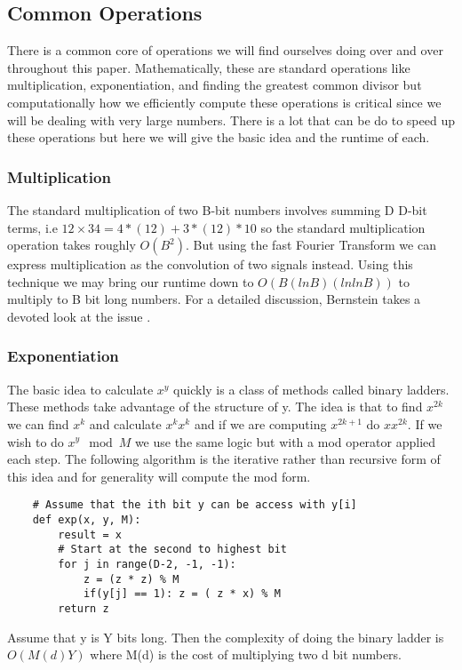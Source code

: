 \documentclass{article}
\begin{document}
\subsection{Common Operations}
There is a common core of operations we will find ourselves doing over and over throughout this paper. Mathematically, these are standard operations like  multiplication, exponentiation, and finding the greatest common divisor but computationally how we efficiently compute these operations is critical since we will be dealing with very large numbers. There is a lot that can be do to speed up these operations but here we will give the basic idea and the runtime of each. 
\subsubsection{Multiplication}
The standard multiplication of two B-bit numbers involves summing D D-bit terms, i.e $12 \times 34 = 4*(12) + 3*(12) *10$ so the standard multiplication operation takes roughly $O(B^2)$.  But using the fast Fourier Transform we can express multiplication as the convolution of two signals instead. Using this technique we may bring our runtime down to $O(B (ln B) ( ln ln B))$ to multiply to B bit long numbers. For a detailed discussion, Bernstein takes a devoted look at the issue \cite{bernstein}. 
\subsubsection{Exponentiation}
The basic idea to calculate $x^y$ quickly is a class of methods called binary ladders. These methods take advantage of the structure of y. The idea is that to find $x^{2k}$ we can find $x^k$ and calculate $x^k x^k$ and if we are computing $x^{2k + 1}$ do $x x^{2k}$. If we wish to do $x^y \mod M$ we use the same logic but with a mod operator applied each step. The following algorithm is the iterative rather than recursive form of this idea and for generality will compute the mod form. 
\begin{verbatim}
    # Assume that the ith bit y can be access with y[i]
    def exp(x, y, M):
        result = x
        # Start at the second to highest bit
        for j in range(D-2, -1, -1):
            z = (z * z) % M
            if(y[j] == 1): z = ( z * x) % M
        return z
\end{verbatim}
Assume that y is Y bits long. Then the complexity of doing the binary ladder is $O(M(d)Y)$ where M(d) is the cost of multiplying two d bit numbers. 
\end{document}
